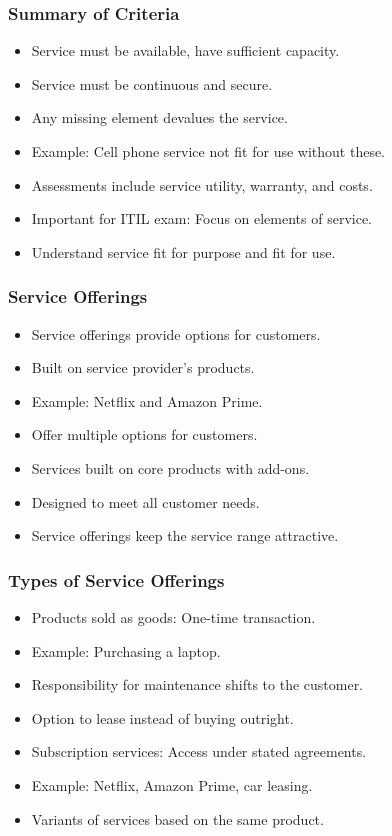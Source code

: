 \documentclass[aspectratio=169, table]{beamer}
\begin{document}
\begin{frame}
	\frametitle{Summary of Criteria}
	\begin{itemize}
		\item Service must be available, have sufficient capacity.
		\item Service must be continuous and secure.
		\item Any missing element devalues the service.
		\item Example: Cell phone service not fit for use without these.
		\item Assessments include service utility, warranty, and costs.
		\item Important for ITIL exam: Focus on elements of service.
		\item Understand service fit for purpose and fit for use.
	\end{itemize}
\end{frame}

\begin{frame}
	\frametitle{Service Offerings}
	\begin{itemize}
		\item Service offerings provide options for customers.
		\item Built on service provider’s products.
		\item Example: Netflix and Amazon Prime.
		\item Offer multiple options for customers.
		\item Services built on core products with add-ons.
		\item Designed to meet all customer needs.
		\item Service offerings keep the service range attractive.
	\end{itemize}
\end{frame}

\begin{frame}
	\frametitle{Types of Service Offerings}
	\begin{itemize}
		\item Products sold as goods: One-time transaction.
		\item Example: Purchasing a laptop.
		\item Responsibility for maintenance shifts to the customer.
		\item Option to lease instead of buying outright.
		\item Subscription services: Access under stated agreements.
		\item Example: Netflix, Amazon Prime, car leasing.
		\item Variants of services based on the same product.
	\end{itemize}
\end{frame}
\end{document}
